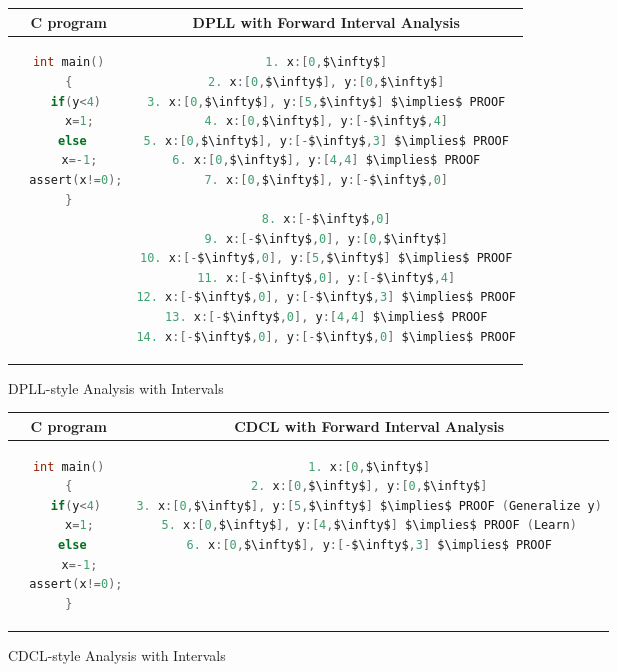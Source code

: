 {\begin{figure}[t]
\centering
\begin{tabular}{c|c}
\hline
C program & DPLL with Forward Interval Analysis \\
\hline
\scriptsize
\begin{lstlisting}[mathescape=true,language=C]
int main()
{
  if(y<4)
   x=1;
  else 
   x=-1;
  assert(x!=0);
}
\end{lstlisting}
&
\begin{lstlisting}[mathescape=true,language=C]
1. x:[0,$\infty$]
2. x:[0,$\infty$], y:[0,$\infty$]
3. x:[0,$\infty$], y:[5,$\infty$] $\implies$ PROOF
4. x:[0,$\infty$], y:[-$\infty$,4]
5. x:[0,$\infty$], y:[-$\infty$,3] $\implies$ PROOF
6. x:[0,$\infty$], y:[4,4] $\implies$ PROOF
7. x:[0,$\infty$], y:[-$\infty$,0]

8. x:[-$\infty$,0]
9. x:[-$\infty$,0], y:[0,$\infty$]
10. x:[-$\infty$,0], y:[5,$\infty$] $\implies$ PROOF
11. x:[-$\infty$,0], y:[-$\infty$,4]
12. x:[-$\infty$,0], y:[-$\infty$,3] $\implies$ PROOF
13. x:[-$\infty$,0], y:[4,4] $\implies$ PROOF
14. x:[-$\infty$,0], y:[-$\infty$,0] $\implies$ PROOF
\end{lstlisting}
\\
\hline
\end{tabular}
\caption{\label{fig:dpll}
DPLL-style Analysis with Intervals}
\end{figure}

\begin{figure}[t]
\centering
\begin{tabular}{c|c}
\hline
C program & CDCL with Forward Interval Analysis \\
\hline
\scriptsize
\begin{lstlisting}[mathescape=true,language=C]
int main()
{
  if(y<4)
   x=1;
  else 
   x=-1;
  assert(x!=0);
}
\end{lstlisting}
&
\begin{lstlisting}[mathescape=true,language=C]
1. x:[0,$\infty$]
2. x:[0,$\infty$], y:[0,$\infty$]
3. x:[0,$\infty$], y:[5,$\infty$] $\implies$ PROOF (Generalize y)
5. x:[0,$\infty$], y:[4,$\infty$] $\implies$ PROOF (Learn)
6. x:[0,$\infty$], y:[-$\infty$,3] $\implies$ PROOF
\end{lstlisting}
\\
\hline
\end{tabular}
\caption{\label{fig:cdcl}
CDCL-style Analysis with Intervals}
\end{figure}
}

